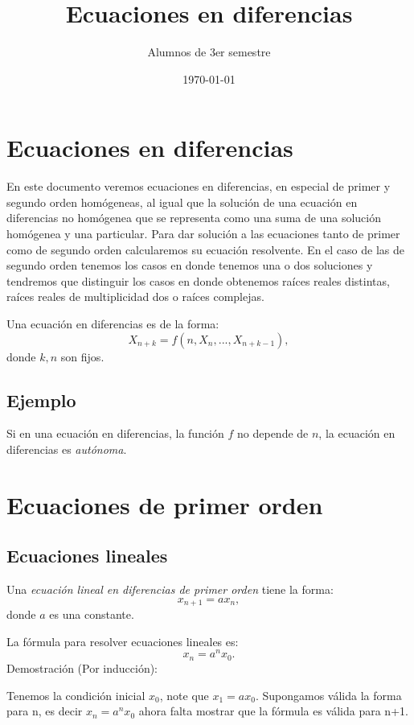 \documentclass{report}
\title{Ecuaciones en diferencias}
\author{Alumnos de 3er semestre}
\date{\today}
\begin{document}
\maketitle
\tableofcontents

\chapter{Ecuaciones en diferencias}
\label{sec:ecuaciones}

En este documento veremos ecuaciones en diferencias, en especial de
primer y segundo orden homógeneas, al igual que la solución de una
ecuación en diferencias no homógenea que se representa como una suma
de una solución homógenea y una particular. Para dar solución a las
ecuaciones tanto de primer como de segundo orden calcularemos su
ecuación resolvente.
En el caso de las de segundo orden tenemos los casos en donde tenemos una o dos soluciones y tendremos que distinguir los casos en donde obtenemos raíces reales distintas, raíces reales de multiplicidad dos o raíces complejas.

Una ecuación en diferencias es de la forma:
$$X_{n+k}=f(n,X_n,...,X_{n+k-1}),$$
donde $k,n$ son fijos.
\section{Ejemplo}
Si en una ecuación en diferencias, la función $f$ no depende de $n$,
la ecuación en diferencias es \emph{autónoma}.

\chapter{Ecuaciones de primer orden}

\section{Ecuaciones lineales}

Una \emph{ecuación lineal en diferencias de primer orden} tiene la forma:
\begin{equation}
  \label{lineal}
  x_{n+1}=ax_n,
\end{equation}
donde $a$ es una constante.

La fórmula para resolver ecuaciones lineales es:
\begin{equation}
  \label{rum}
  x_n=a^nx_0.
\end{equation}
Demostración (Por inducción):

Tenemos la condición inicial $x_0$, note que $x_1=ax_0$.  Supongamos
válida la forma para n, es decir $x_n=a^nx_0$ ahora falta mostrar que
la fórmula es válida para n+1.
\end{document}
